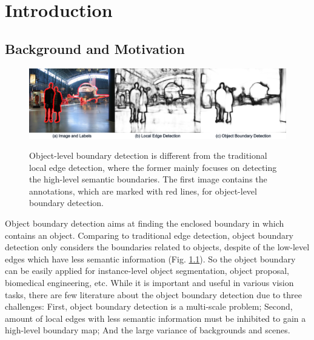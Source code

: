 \documentclass[senior]{IPSstyle}
\begin{document}
 \makepreliminarypages
 \singlespace
 \frontmatter
 \tableofcontents
 \listoffigures
 \listoftables
 \mainmatter
 \clearemptydoublepage
 \setlength{\baselineskip}{23.0pt}

\chapter{Introduction} \label{introduction}



\section{Background and Motivation}

\begin{figure}[t]
  \centering
  \includegraphics[width=15cm]{object_boundary_vs_local_edge.png}\\
  \caption{Object-level boundary detection is different from the traditional local edge detection, where the former mainly focuses on detecting the high-level semantic boundaries. The first image contains the annotations, which are marked with red lines, for object-level boundary detection.}\label{object_boundary_vs_local_edge}
\end{figure}

Object boundary detection aims at finding the enclosed boundary in which contains an object. Comparing to traditional edge detection, object boundary detection only considers the boundaries related to objects, despite of the low-level edges which have less semantic information (Fig. \ref{object_boundary_vs_local_edge}). So the object boundary can be easily applied for instance-level object segmentation, object proposal\cite{Yang2016, Zitnick2014}, biomedical engineering\cite{Lee2015, Quan2016, Ronneberger2015}, etc. While it is important and useful in various vision tasks, there are few literature about the object boundary detection due to three challenges: First, object boundary detection is a multi-scale problem;  Second, amount of local edges with less semantic information must be inhibited to gain a high-level boundary map; And the large variance of backgrounds and scenes.
\end{document}
